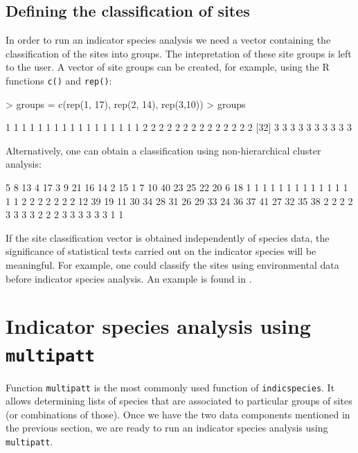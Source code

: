 \documentclass[11pt,a4paper]{article}
\begin{document}
\subsection{Defining the classification of sites}
In order to run an indicator species analysis we need a vector containing the classification of the sites into groups. The intepretation of these site groups is left to the user. A vector of site groups can be created, for example, using the R functions \texttt{c()} and \texttt{rep()}:
\begin{Schunk}
\begin{Sinput}
> groups = c(rep(1, 17), rep(2, 14), rep(3,10))
> groups
\end{Sinput}
\begin{Soutput}
 [1] 1 1 1 1 1 1 1 1 1 1 1 1 1 1 1 1 1 2 2 2 2 2 2 2 2 2 2 2 2 2 2
[32] 3 3 3 3 3 3 3 3 3 3
\end{Soutput}
\end{Schunk}
Alternatively, one can obtain a classification using non-hierarchical cluster analysis:
\begin{Schunk}
\begin{Soutput}
 5  8 13  4 17  3  9 21 16 14  2 15  1  7 10 40 23 25 22 20  6 18 
 1  1  1  1  1  1  1  1  1  1  1  1  1  1  1  2  2  2  2  2  2  2 
12 39 19 11 30 34 28 31 26 29 33 24 36 37 41 27 32 35 38 
 2  2  2  2  3  3  3  3  2  2  2  3  3  3  3  3  3  1  1 
\end{Soutput}
\end{Schunk}

If the site classification vector is obtained independently of species data, the significance of statistical tests carried out on the indicator species will be meaningful. For example, one could classify the sites using environmental data before indicator species analysis. An example is found in \citet{Borcard2011}.

\section{Indicator species analysis using \texttt{multipatt}}
Function \texttt{multipatt} is the most commonly used function of \texttt{indicspecies}. It allows determining lists of species that are associated to particular groups of sites (or combinations of those). Once we have the two data components mentioned in the previous section, we are ready to run an indicator species analysis using \texttt{multipatt}.
\end{document}
